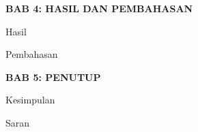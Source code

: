 	\vspace{1em}
	
	\noindent 
	\textbf{BAB 4: HASIL DAN PEMBAHASAN}
	\begin{sysenumerate}
		\setcounter{sysenumeratei}{4}
		\item[] 
		\begin{sysenumerate}
			\item Hasil
			\item Pembahasan
		\end{sysenumerate}
	\end{sysenumerate}
		
	\vspace{1em}
		
	\noindent 
	\textbf{BAB 5: PENUTUP}
	\begin{sysenumerate}
	\setcounter{sysenumeratei}{5}
	\item[] 
		\begin{sysenumerate}
			\item Kesimpulan
			\item Saran
		\end{sysenumerate}
	\end{sysenumerate}